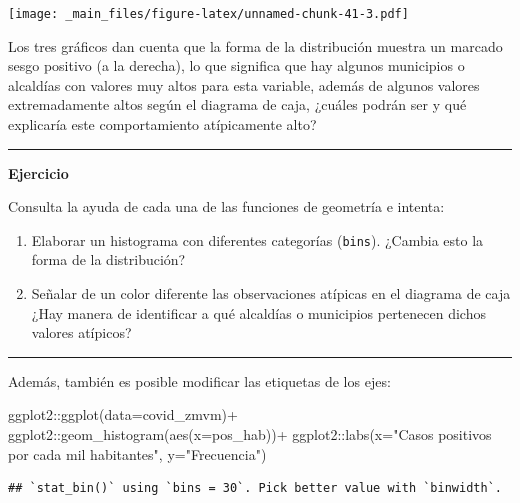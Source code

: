 \documentclass[
  11pt,
  oneside]{book}
\newenvironment{Shaded}{\begin{snugshade}}{\end{snugshade}}
\newcommand{\AttributeTok}[1]{\textcolor[rgb]{0.77,0.63,0.00}{#1}}
\newcommand{\FunctionTok}[1]{\textcolor[rgb]{0.00,0.00,0.00}{#1}}
\newcommand{\NormalTok}[1]{#1}
\newcommand{\SpecialCharTok}[1]{\textcolor[rgb]{0.00,0.00,0.00}{#1}}
\newcommand{\StringTok}[1]{\textcolor[rgb]{0.31,0.60,0.02}{#1}}
\begin{document}
\texttt{[image: \_main\_files/figure-latex/unnamed-chunk-41-3.pdf]}

Los tres gráficos dan cuenta que la forma de la distribución muestra un marcado sesgo positivo (a la derecha), lo que significa que hay algunos municipios o alcaldías con valores muy altos para esta variable, además de algunos valores extremadamente altos según el diagrama de caja, ¿cuáles podrán ser y qué explicaría este comportamiento atípicamente alto?

\begin{center}\rule{0.5\linewidth}{0.5pt}\end{center}

\textbf{Ejercicio}

Consulta la ayuda de cada una de las funciones de geometría e intenta:

\begin{enumerate}
\def\labelenumi{\roman{enumi})}
\item
  Elaborar un histograma con diferentes categorías (\texttt{bins}). ¿Cambia esto la forma de la distribución?
\item
  Señalar de un color diferente las observaciones atípicas en el diagrama de caja ¿Hay manera de identificar a qué alcaldías o municipios pertenecen dichos valores atípicos?
\end{enumerate}

\begin{center}\rule{0.5\linewidth}{0.5pt}\end{center}

Además, también es posible modificar las etiquetas de los ejes:

\begin{Shaded}
\begin{Highlighting}[]
\NormalTok{ggplot2}\SpecialCharTok{::}\FunctionTok{ggplot}\NormalTok{(}\AttributeTok{data=}\NormalTok{covid\_zmvm)}\SpecialCharTok{+}
\NormalTok{  ggplot2}\SpecialCharTok{::}\FunctionTok{geom\_histogram}\NormalTok{(}\FunctionTok{aes}\NormalTok{(}\AttributeTok{x=}\NormalTok{pos\_hab))}\SpecialCharTok{+}
\NormalTok{  ggplot2}\SpecialCharTok{::}\FunctionTok{labs}\NormalTok{(}\AttributeTok{x=}\StringTok{"Casos positivos por cada mil habitantes"}\NormalTok{, }\AttributeTok{y=}\StringTok{"Frecuencia"}\NormalTok{)}
\end{Highlighting}
\end{Shaded}

\begin{verbatim}
## `stat_bin()` using `bins = 30`. Pick better value with `binwidth`.
\end{verbatim}
\end{document}
